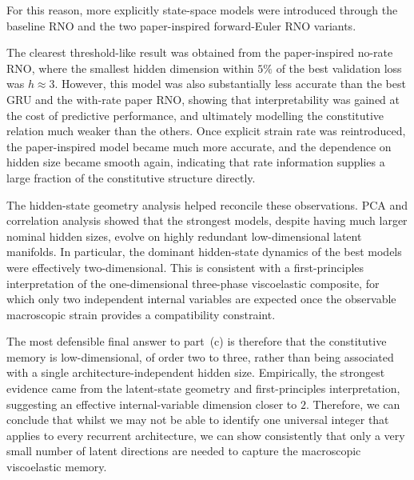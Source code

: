 \documentclass[11pt,a4paper, onecolumn]{article}
\begin{document}
For this reason, more explicitly state-space models were introduced through the baseline RNO and the two paper-inspired forward-Euler RNO variants.

The clearest threshold-like result was obtained from the paper-inspired no-rate RNO, where the smallest hidden dimension within $5\%$ of the best validation loss was $h\approx 3$. However, this model was also substantially less accurate than the best GRU and the with-rate paper RNO, showing that interpretability was gained at the cost of predictive performance, and ultimately modelling the constitutive relation much weaker than the others. Once explicit strain rate was reintroduced, the paper-inspired model became much more accurate, and the dependence on hidden size became smooth again, indicating that rate information supplies a large fraction of the constitutive structure directly.

The hidden-state geometry analysis helped reconcile these observations. PCA and correlation analysis showed that the strongest models, despite having much larger nominal hidden sizes, evolve on highly redundant low-dimensional latent manifolds. In particular, the dominant hidden-state dynamics of the best models were effectively two-dimensional. This is consistent with a first-principles interpretation of the one-dimensional three-phase viscoelastic composite, for which only two independent internal variables are expected once the observable macroscopic strain provides a compatibility constraint.

The most defensible final answer to part~(c) is therefore that the constitutive memory is low-dimensional, of order two to three, rather than being associated with a single architecture-independent hidden size. Empirically, the strongest evidence came from the latent-state geometry and first-principles interpretation, suggesting an effective internal-variable dimension closer to $2$. Therefore, we can conclude that whilst we may not be able to identify one universal integer that applies to every recurrent architecture, we can show consistently that only a very small number of latent directions are needed to capture the macroscopic viscoelastic memory.






\end{document}
